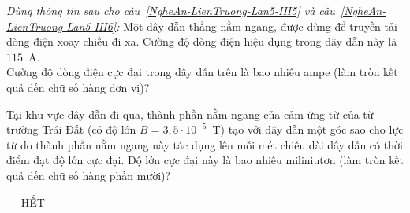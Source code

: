 	\begin{ex}%
		\label{NgheAn-LienTruong-Lan5-III5}\textit{Dùng thông tin sau cho câu~\ref{NgheAn-LienTruong-Lan5-III5} và câu~\ref{NgheAn-LienTruong-Lan5-III6}:} Một dây dẫn thẳng nằm ngang, được dùng để truyền tải dòng điện xoay chiều đi xa. Cường độ dòng điện hiệu dụng trong dây dẫn này là $115$~A.\\
		Cường độ dòng điện cực đại trong dây dẫn trên là bao nhiêu ampe (làm tròn kết quả đến chữ số hàng đơn vị)?
		\par
	\end{ex}

	\begin{ex}%
		\label{NgheAn-LienTruong-Lan5-III6}Tại khu vực dây dẫn đi qua, thành phần nằm ngang của cảm ứng từ của từ trường Trái Đất (có độ lớn $B=3{,}5\cdot 10^{-5}$~T) tạo với dây dẫn một góc sao cho lực từ do thành phần nằm ngang này tác dụng lên mỗi mét chiều dài dây dẫn có thời điểm đạt độ lớn cực đại. Độ lớn cực đại này là bao nhiêu miliniutơn (làm tròn kết quả đến chữ số hàng phần mười)?
		\par
	\end{ex}

	\centerline{--- HẾT ---}


